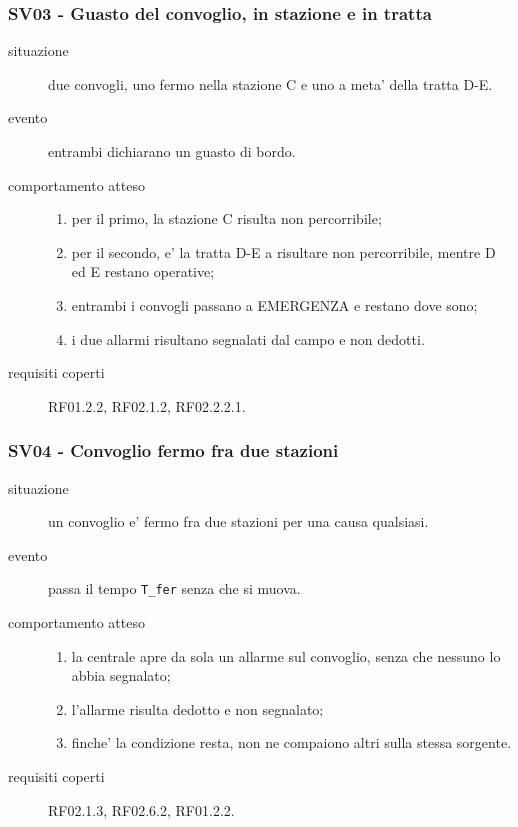 \documentclass[11pt]{article}
\begin{document}
\subsubsection{SV03 - Guasto del convoglio, in stazione e in tratta}
\label{sec:org2c794ae}

\begin{description}
\item[{situazione}] due convogli, uno fermo nella stazione C e uno a meta' della tratta D-E.
\item[{evento}] entrambi dichiarano un guasto di bordo.
\item[{comportamento atteso}] \begin{enumerate}
\item per il primo, la stazione C risulta non percorribile;
\item per il secondo, e' la tratta D-E a risultare non percorribile, mentre D ed E restano operative;
\item entrambi i convogli passano a EMERGENZA e restano dove sono;
\item i due allarmi risultano segnalati dal campo e non dedotti.
\end{enumerate}
\item[{requisiti coperti}] RF01.2.2, RF02.1.2, RF02.2.2.1.
\end{description}
\subsubsection{SV04 - Convoglio fermo fra due stazioni}
\label{sec:orgcffde53}

\begin{description}
\item[{situazione}] un convoglio e' fermo fra due stazioni per una causa qualsiasi.
\item[{evento}] passa il tempo \texttt{T\_fer} senza che si muova.
\item[{comportamento atteso}] \begin{enumerate}
\item la centrale apre da sola un allarme sul convoglio, senza che nessuno lo abbia segnalato;
\item l'allarme risulta dedotto e non segnalato;
\item finche' la condizione resta, non ne compaiono altri sulla stessa sorgente.
\end{enumerate}
\item[{requisiti coperti}] RF02.1.3, RF02.6.2, RF01.2.2.
\end{description}
\end{document}
